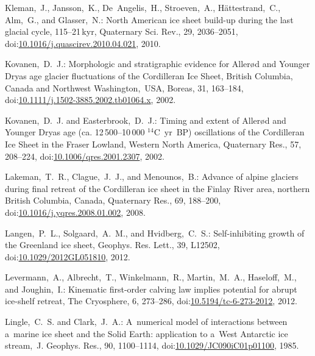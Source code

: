 \documentclass[tc, manuscript]{copernicus}
\begin{document}
\begin{thebibliography}{114}
Kleman,~J., Jansson,~K., De~Angelis,~H., Stroeven,~A., H\"{a}ttestrand,~C., Alm,~G., and Glasser,~N.: North American ice sheet build-up during the last glacial cycle, 115--21\,kyr, Quaternary Sci. Rev., 29, 2036--2051,
doi:\href{http://dx.doi.org/10.1016/j.quascirev.2010.04.021}{10.1016/j.quascirev.2010.04.021}, 2010.


Kovanen,~D.~J.: Morphologic and stratigraphic evidence for Aller{\o}d and Younger Dryas age glacier fluctuations of the Cordilleran Ice Sheet, British Columbia, Canada and Northwest Washington,~USA, Boreas, 31, 163--184,
doi:\href{http://dx.doi.org/10.1111/j.1502-3885.2002.tb01064.x}{10.1111/j.1502-3885.2002.tb01064.x}, 2002.


Kovanen,~D.~J. and Easterbrook,~D.~J.: Timing and extent of Aller{\o}d and Younger Dryas age (ca. 12\,500--10\,000 $^{14}$C~yr~BP) oscillations of the Cordilleran Ice Sheet in the Fraser Lowland, Western North America, Quaternary Res., 57, 208--224,
doi:\href{http://dx.doi.org/10.1006/qres.2001.2307}{10.1006/qres.2001.2307}, 2002.


Lakeman,~T.~R., Clague,~J.~J., and Menounos,~B.: Advance of alpine glaciers during final retreat of the Cordilleran ice sheet in the Finlay River area, northern British Columbia, Canada, Quaternary Res., 69, 188--200,
doi:\href{http://dx.doi.org/10.1016/j.yqres.2008.01.002}{10.1016/j.yqres.2008.01.002}, 2008.


Langen,~P.~L., Solgaard,~A.~M., and Hvidberg,~C.~S.: Self-inhibiting growth of the Greenland ice sheet, Geophys. Res. Lett., 39, L12502,
doi:\href{http://dx.doi.org/10.1029/2012GL051810}{10.1029/2012GL051810}, 2012.


 Levermann,~A., Albrecht,~T., Winkelmann,~R., Martin,~M.~A., Haseloff,~M., and Joughin,~I.: Kinematic first-order calving law implies potential for  abrupt ice-shelf retreat, The Cryosphere, 6, 273--286,
doi:\href{http://dx.doi.org/10.5194/tc-6-273-2012}{10.5194/tc-6-273-2012}, 2012.


Lingle,~C.~S. and Clark,~J.~A.: A~numerical model of interactions between a~marine ice sheet and the Solid Earth: application to a~West Antarctic ice stream,~J. Geophys. Res., 90, 1100--1114,
doi:\href{http://dx.doi.org/10.1029/JC090iC01p01100}{10.1029/JC090iC01p01100}, 1985.



\end{thebibliography}
\end{document}
